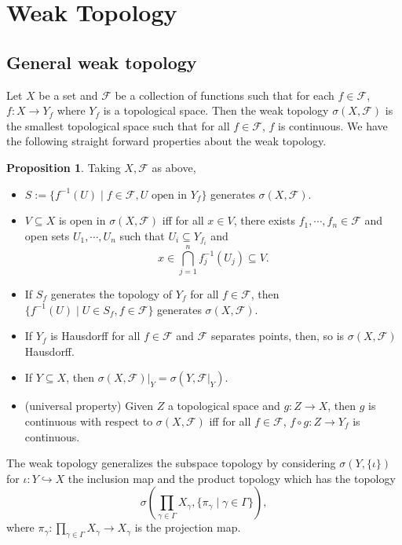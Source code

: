 \documentclass[]{article}
\theoremstyle{definition}
\newtheorem{proposition}{Proposition}[section]
\begin{document}
\newpage
\section{Weak Topology}

\subsection{General weak topology}

Let \(X\) be a set and \(\mathcal{F}\) be a collection of functions such that for each \(f \in \mathcal{F}\), 
\(f : X \to Y_f\) where \(Y_f\) is a topological space. Then the weak topology \(\sigma(X, \mathcal{F})\) 
is the smallest topological space such that for all \(f \in \mathcal{F}\), \(f\) is continuous.
We have the following straight forward properties about the weak topology.

\begin{proposition} Taking \(X, \mathcal{F}\) as above,
  \begin{itemize}
    \item \(S := \{f^{-1}(U) \mid f \in \mathcal{F}, U \text{ open in } Y_f\}\) generates \(\sigma(X, \mathcal{F})\).
    \item \(V \subseteq X\) is open in \(\sigma(X, \mathcal{F})\) iff for all \(x \in V\), there exists 
    \(f_1, \cdots, f_n \in \mathcal{F}\) and open sets \(U_1, \cdots, U_n\) such that \(U_i \subseteq Y_{f_i}\)
    and 
    \[x \in \bigcap_{j = 1}^n f^{-1}_j(U_j) \subseteq V.\]
    \item If \(S_f\) generates the topology of \(Y_f\) for all \(f \in \mathcal{F}\), then 
    \(\{f^{-1}(U) \mid U \in S_f, f \in \mathcal{F}\}\) generates \(\sigma(X, \mathcal{F})\).
    \item If \(Y_f\) is Hausdorff for all \(f \in \mathcal{F}\) and \(\mathcal{F}\) separates points, 
    then, so is \(\sigma(X, \mathcal{F})\) Hausdorff.
    \item If \(Y \subseteq X\), then \(\sigma(X, \mathcal{F})|_Y = \sigma(Y, \mathcal{F}|_Y)\).
    \item (universal property) Given \(Z\) a topological space and \(g : Z \to X\), then \(g\) is continuous 
    with respect to \(\sigma(X, \mathcal{F})\) iff for all \(f \in \mathcal{F}\), \(f \circ g : Z \to Y_f\)
    is continuous.
  \end{itemize}
\end{proposition}

The weak topology generalizes the subspace topology by considering \(\sigma(Y, \{\iota\})\) for 
\(\iota : Y \hookrightarrow X\) the inclusion map and the product topology which has the topology 
\[\sigma\left(\prod_{\gamma \in \Gamma} X_{\gamma}, \{\pi_{\gamma} \mid \gamma \in \Gamma\}\right),\]
where \(\pi_{\gamma} : \prod_{\gamma \in \Gamma} X_{\gamma} \to X_{\gamma}\) is the projection map.
\end{document}
